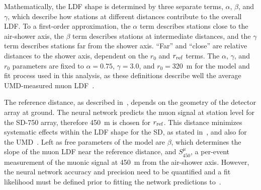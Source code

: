 Mathematically, the LDF shape is determined by three separate terms, $\alpha$, $\beta$, and $\gamma$, which describe how stations at different distances contribute to the overall LDF.
To a first-order approximation, the $\alpha$ term describes stations close to the air-shower axis, the $\beta$ term describes stations at intermediate distances, and the $\gamma$ term describes stations far from the shower axis.
``Far'' and ``close'' are relative distances to the shower axis, dependent on the $r_{0}$ and $r_{\rm ref}$ terms.
The $\alpha$, $\gamma$, and $r_{0}$ parameters are fixed to $\alpha=0.75$, $\gamma=3.0$, and $r_{0}=$\qty{320}{\meter} for the model and fit process used in this analysis, as these definitions describe well the average UMD-measured muon LDF~\cite{flaviagesualdi_phd2022}.

The reference distance, as described in~, depends on the geometry of the detector array at ground.
The neural network predicts the muon signal at station level for the SD-750 array, therefore \qty{450}{\meter} is chosen for $r_{\rm ref}$.
This distance minimizes systematic effects within the LDF shape for the SD, as stated in~, and also for the UMD~\cite{diego_astropartphys2015_mldf}.
Left as free parameters of the model are $\beta$, which determines the slope of the muon LDF near the reference distance, and $S^{\mu}_{450}$, a per-event measurement of the muonic signal at \qty{450}{\meter} from the air-shower axis.
However, the neural network accuracy and precision need to be quantified and a fit likelihood must be defined prior to fitting the network predictions to~.






